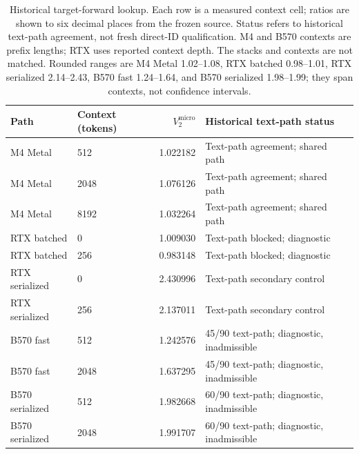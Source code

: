 \begin{table}[t]
\caption{Historical target-forward lookup. Each row is a measured context cell; ratios are shown to six decimal places from the frozen source. Status refers to historical text-path agreement, not fresh direct-ID qualification. M4 and B570 contexts are prefix lengths; RTX uses reported context depth. The stacks and contexts are not matched. Rounded ranges are M4 Metal 1.02--1.08, RTX batched 0.98--1.01, RTX serialized 2.14--2.43, B570 fast 1.24--1.64, and B570 serialized 1.98--1.99; they span contexts, not confidence intervals.}
\label{tab:verificationlookup}
\centering
\begin{tabular}{llrl}
\toprule
Path & Context (tokens) & $V_2^{\mathrm{micro}}$ & Historical text-path status \\
\midrule
M4 Metal & 512 & 1.022182 & Text-path agreement; shared path \\
M4 Metal & 2048 & 1.076126 & Text-path agreement; shared path \\
M4 Metal & 8192 & 1.032264 & Text-path agreement; shared path \\
RTX batched & 0 & 1.009030 & Text-path blocked; diagnostic \\
RTX batched & 256 & 0.983148 & Text-path blocked; diagnostic \\
RTX serialized & 0 & 2.430996 & Text-path secondary control \\
RTX serialized & 256 & 2.137011 & Text-path secondary control \\
B570 fast & 512 & 1.242576 & 45/90 text-path; diagnostic, inadmissible \\
B570 fast & 2048 & 1.637295 & 45/90 text-path; diagnostic, inadmissible \\
B570 serialized & 512 & 1.982668 & 60/90 text-path; diagnostic, inadmissible \\
B570 serialized & 2048 & 1.991707 & 60/90 text-path; diagnostic, inadmissible \\
\bottomrule
\end{tabular}
\end{table}
